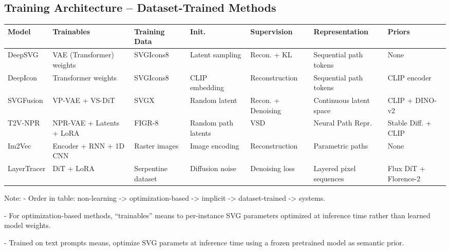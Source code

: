 \begin{landscape}
\thispagestyle{empty}
\centering
\small
\section*{Training Architecture – Dataset-Trained Methods}

\begin{tabularx}{\linewidth}{
>{\raggedright\arraybackslash}p{2.3cm} |
>{\raggedright\arraybackslash}p{3cm} |
>{\raggedright\arraybackslash}p{2.5cm} |
>{\raggedright\arraybackslash}p{2cm} |
>{\raggedright\arraybackslash}p{2.5cm} |
>{\raggedright\arraybackslash}p{2.8cm} |
X}
\toprule
\textbf{Model} & \textbf{Trainables} & \textbf{Training Data} & \textbf{Init.} & \textbf{Supervision} & \textbf{Representation} & \textbf{Priors} \\
\midrule
DeepSVG & VAE (Transformer) weights & SVGIcons8 & Latent sampling & Recon. + KL & Sequential path tokens & None \\ \hline
DeepIcon & Transformer weights & SVGIcons8 & CLIP embedding & Reconstruction & Sequential path tokens & CLIP encoder \\ \hline
SVGFusion & VP-VAE + VS-DiT & SVGX & Random latent & Recon. + Denoising & Continuous latent space & CLIP + DINO-v2 \\ \hline
T2V-NPR & NPR-VAE + Latents + LoRA & FIGR-8 & Random path latents & VSD & Neural Path Repr. & Stable Diff. + CLIP \\ \hline
Im2Vec & Encoder + RNN + 1D CNN & Raster images & Image encoding & Reconstruction & Parametric paths & None \\ \hline
LayerTracer & DiT + LoRA & Serpentine dataset & Diffusion noise & Denoising loss & Layered pixel sequences & Flux DiT + Florence-2 \\
\bottomrule
\end{tabularx}
\end{landscape}












Note:
- Order in table: non-learning -> optimization-based -> implicit -> dataset-trained -> systems.

- For optimization-based methods, “trainables” means to per-instance SVG parameters optimized at inference time rather than learned model weights.

- Trained on text prompts means, optimize SVG paramets at inference time using a frozen pretrained model as semantic prior.

